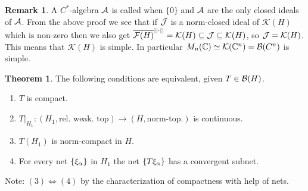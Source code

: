 \documentclass[10pt,english,a4paper]{article}
\theoremstyle{definition}
\newtheorem*{theorem}{Theorem}
\newtheorem*{remark}{Remark}
\let\emph\relax %
\def\Ff{\mathcal{F}}
\def\Kf{\mathcal{K}}
\begin{document}
\begin{remark}
    A $C^*$-algebra $\mathcal{A}$ is called \emph{simple} when $\{0\}$ and $\mathcal{A}$ are
the only closed ideals of $\mathcal{A}$. From the above proof we see that if $\mathcal{J}$ is a
norm-closed ideal of $\Kf(H)$ which is non-zero then we also get
$\ol{\Ff(H)}^{||\cdot||} = \Kf(H) \subseteq \Js \subseteq \Kf(H)$, so $\Js =
\Kf(H)$.
This means that $\Kf(H)$ is simple. In particular $M_n(\C) \simeq \Kf(\C^n) =
\Bs(C^n)$ is simple.
\end{remark}

\begin{theorem}
    The following conditions are equivalent, given $T \in \mathcal{B}(H)$.
    \begin{enumerate}[(1)]
        \item $T$ is compact.
        \item $T \lvert_{H_1} \colon (H_1, \text{rel. weak. top}) \to (H, \text{norm-top.})$ is 
        continuous.
        \item $T(H_1)$ is norm-compact in $H$. 
        \item For every net $\{\xi_{\alpha}\}$ in $H_1$ the net $\{T\xi_{\alpha}\}$ has 
              a convergent subnet.
    \end{enumerate}
\end{theorem}

Note: $(3) \iff (4)$ by the characterization of compactness with help of nets.
\end{document}
